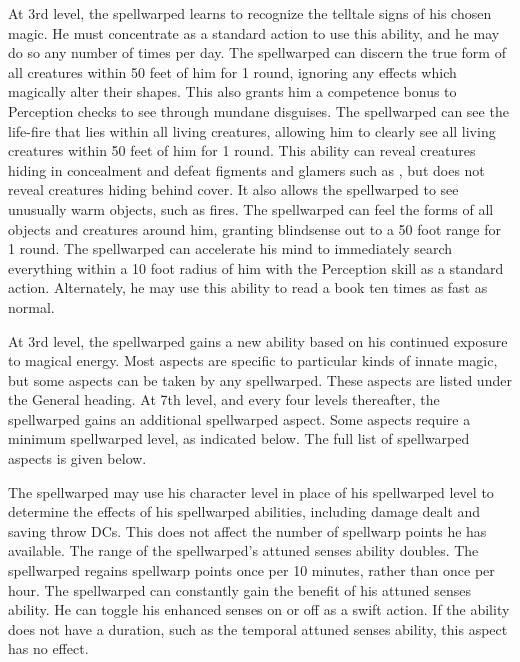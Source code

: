  At 3rd level, the spellwarped learns to recognize the telltale signs of his chosen magic. He must concentrate as a standard action to use this ability, and he may do so any number of times per day.
 The spellwarped can discern the true form of all creatures within 50 feet of him for 1 round, ignoring any effects which magically alter their shapes. This also grants him a  competence bonus to Perception checks to see through mundane disguises.
 The spellwarped can see the life-fire that lies within all living creatures, allowing him to clearly see all living creatures within 50 feet of him for 1 round. This ability can reveal creatures hiding in concealment and defeat figments and glamers such as , but does not reveal creatures hiding behind cover. It also allows the spellwarped to see unusually warm objects, such as fires.
 The spellwarped can feel the forms of all objects and creatures around him, granting blindsense out to a 50 foot range for 1 round.
 The spellwarped can accelerate his mind to immediately search everything within a 10 foot radius of him with the Perception skill as a standard action. Alternately, he may use this ability to read a book ten times as fast as normal.

 At 3rd level, the spellwarped gains a new ability based on his continued exposure to magical energy. Most aspects are specific to particular kinds of innate magic, but some aspects can be taken by any spellwarped. These aspects are listed under the General heading.  At 7th level, and every four levels thereafter, the spellwarped gains an additional spellwarped aspect. Some aspects require a minimum spellwarped level, as indicated below. The full list of spellwarped aspects is given below.

 The spellwarped may use his character level in place of his spellwarped level to determine the effects of his spellwarped abilities, including damage dealt and saving throw DCs. This does not affect the number of spellwarp points he has available.
 The range of the spellwarped's attuned senses ability doubles.
 The spellwarped regains spellwarp points once per 10 minutes, rather than once per hour.
 The spellwarped can constantly gain the benefit of his attuned senses ability. He can toggle his enhanced senses on or off as a swift action. If the ability does not have a duration, such as the temporal attuned senses ability, this aspect has no effect.

